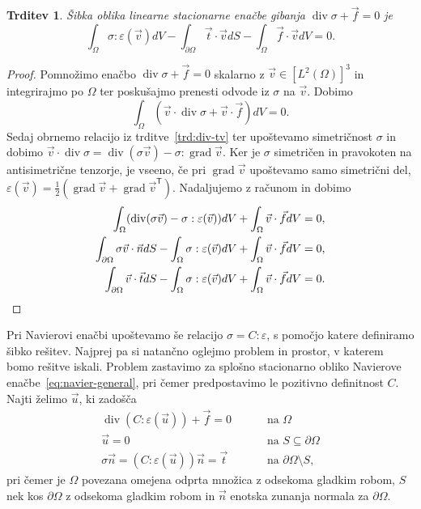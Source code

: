 \documentclass[12pt,a4paper,twoside]{article}
\theoremstyle{definition} %
\theoremstyle{plain} %
\newtheorem{trditev}[definicija]{Trditev}
\numberwithin{equation}{section}
\newcommand{\T}{\mathsf{T}}
\renewcommand{\div}{\operatorname{div}}
\newcommand{\grad}{\operatorname{grad}}
\newcommand{\eps}{\varepsilon}
\newcommand{\vv}{\vec{v}}
\newcommand{\vt}{\vec{t}}
\newcommand{\vu}{\vec{u}}
\newcommand{\vn}{\vec{n}}
\newcommand{\vf}{\vec{f}}
\newcommand{\ts}{\sigma}
\begin{document}
\begin{trditev}
  Šibka oblika linearne stacionarne enačbe gibanja $\div \ts + \vf = 0$ je
  \begin{equation}
  \int_{\Omega}\ts : \eps(\vv) dV - \int_{\partial \Omega} \vt\cdot \vv dS -
    \int_{\Omega} \vf\cdot \vv dV = 0.
    \label{eq:cauchy-sibka}
  \end{equation}
\end{trditev}
\begin{proof}
Pomnožimo enačbo $\div\ts + \vf = 0$ skalarno z $\vv \in [L^2(\Omega)]^3$ in integrirajmo po
$\Omega$ ter poskušajmo prenesti odvode iz $\ts$ na $\vv$. Dobimo
\[
  \int_{\Omega}(\vv\cdot\div \ts + \vv\cdot\vf)dV = 0.
\]
Sedaj obrnemo relacijo iz trditve~\ref{trd:div-tv} ter upoštevamo simetričnost
$\ts$ in dobimo $\vv\cdot\div\ts = \div(\sigma \vv) - \sigma:\grad \vv$.
Ker je $\ts$ simetričen in pravokoten na antisimetrične tenzorje, je vseeno, če
pri $\grad\vv$ upoštevamo samo simetrični del, $\eps(\vv) =
\frac12(\grad\vv+\grad\vv^\T)$. Nadaljujemo z računom in dobimo
\begin{align*}
\int_{\Omega}(\div(\sigma \vv) - \ts:\eps(\vv)) dV + \int_{\Omega} \vv\cdot\vf dV &= 0, \\
\int_{\partial \Omega}\sigma \vv \cdot \vn dS - \int_\Omega\ts:\eps(\vv) dV +
\int_{\Omega} \vv\cdot\vf dV &= 0, \\
\int_{\partial \Omega}\vv \cdot \vt dS - \int_\Omega\ts:\eps(\vv) dV +
\int_{\Omega} \vv\cdot\vf dV &= 0. \qedhere
\end{align*}
\end{proof}
Pri Navierovi enačbi upoštevamo še relacijo $\ts = C:\eps$, s pomočjo katere definiramo šibko
rešitev. Najprej pa si natančno oglejmo problem in prostor, v katerem bomo rešitve iskali. Problem
zastavimo za splošno stacionarno obliko Navierove enačbe~\eqref{eq:navier-general}, pri čemer
predpostavimo le pozitivno definitnost $C$. Najti želimo $\vu$, ki zadošča
\begin{align}
  \div(C:\eps(\vu)) + \vf = 0 &\qquad \text{ na } \Omega
  \nonumber \\
  \vu = 0 &\qquad \text{ na } S \subseteq \partial\Omega \label{eq:navier-general-problem} \\
  \ts\vn = (C:\eps(\vu))\vn = \vt &\qquad \text{ na } \partial\Omega \setminus
  S, \nonumber
\end{align}
pri čemer je $\Omega$ povezana omejena odprta množica z odsekoma gladkim robom,
$S$ nek kos $\partial\Omega$ z odsekoma gladkim robom in $\vn$
enotska zunanja normala za $\partial\Omega$.
\end{document}
